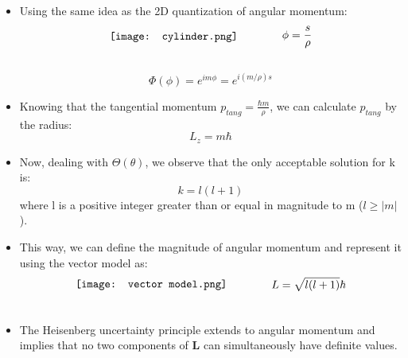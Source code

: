 \documentclass[12pt, letterpaper, twoside]{article}
\begin{document}
\begin{itemize}
    \item Using the same idea as the 2D quantization of angular momentum:
    \begin{align}
        \vcenter{\hbox{\texttt{[image: cylinder.png]}}}
        &\qquad\qquad
        \begin{aligned}
            \phi = \frac{s}{\rho}
        \end{aligned}\\
        \vcenter{\hbox{\begin{minipage}{4cm}
        \end{minipage}}}
        & \notag
    \end{align}
    \begin{equation*}
        \Phi(\phi) = e^{im\phi} = e^{i(m/\rho)s}
    \end{equation*}
    \item Knowing that the tangential momentum $p_{tang} = \frac{\hbar m}{\rho}$, we can calculate $p_{tang}$ by the radius:
    \begin{equation*}
        L_z = m\hbar
    \end{equation*}
    \item Now, dealing with $\Theta(\theta)$, we observe that the only acceptable solution for k is:
    \begin{equation*}
        k = l(l+1)
    \end{equation*}
    where l is a positive integer greater than or equal in magnitude to m ($l \geq |m|$).
    \item This way, we can define the magnitude of angular momentum and represent it using the vector model as:
    \begin{align}
        \vcenter{\hbox{\texttt{[image: vector model.png]}}}
        &\qquad\qquad
        \begin{aligned}
            L = \sqrt{l(l+1)}\hbar
        \end{aligned}\\
        \vcenter{\hbox{\begin{minipage}{4cm}
        \end{minipage}}}
        & \notag
    \end{align}
    \item The Heisenberg uncertainty principle extends to angular momentum and implies that no two components of \textbf{L} can simultaneously have definite values.
\end{itemize}
\end{document}

